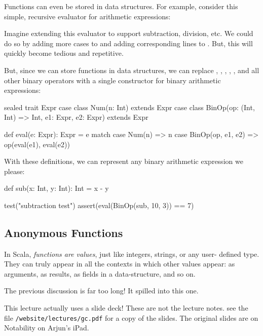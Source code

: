 \documentclass{book}
\begin{document}
Functions can even be stored in data structures. For example, consider
this simple, recursive evaluator for arithmetic expressions:


Imagine extending this evaluator to support subtraction, division, etc.
We could do so by adding more cases to  and adding corresponding
lines to . But, this will quickly become tedious and repetitive.

But, since we can store functions in data structures, we can replace
, , , , , and all other binary operators with
a single constructor for binary arithmetic expressions:

\begin{scalacode}
sealed trait Expr
case class Num(n: Int) extends Expr
case class BinOp(op: (Int, Int) => Int, e1: Expr, e2: Expr) extends Expr

def eval(e: Expr): Expr = e match {
  case Num(n) => n
  case BinOp(op, e1, e2) => op(eval(e1), eval(e2))
}
\end{scalacode}

With these definitions, we can represent any binary arithmetic expression
we please:

\begin{scalacode}
def sub(x: Int, y: Int): Int = x - y

test("subtraction test") {
  assert(eval(BinOp(sub, 10, 3)) == 7)
}
\end{scalacode}

\subsection{Anonymous Functions}

In Scala, \emph{functions are values}, just like integers, strings, or any user-
defined type. They can truly appear in all the contexts in which other values
appear: as arguments, as results, as fields in a data-structure, and so on.


The previous discussion is far too long! It spilled into this one.

\newlecture

This lecture actually uses a slide deck! These are not the lecture notes.
see the file \texttt{/website/lectures/gc.pdf} for a copy of the slides.
The original slides are on Notability on Arjun's iPad.
\end{document}
